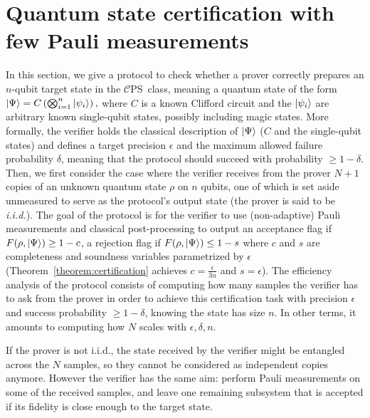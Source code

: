 \documentclass[a4paper,twocolumn,11pt,unpublished]{quantumarticle}
\newcommand{\CEPS}{$\mathcal C$PS}
\begin{document}
\section{Quantum state certification with few Pauli measurements}
\label{section:certification}
In this section, we give a protocol to check whether a prover correctly prepares an $n$-qubit target state in the \CEPS\ class, meaning a quantum state of the form
        \(
        \ket{\Psi} = C\left(\bigotimes_{i=1}^n \ket{\psi_i}\right),
        \)
        where $C$ is a known Clifford circuit and the $\ket{\psi_i}$ are arbitrary known single-qubit states, possibly including magic states.
        More formally, 
the verifier holds the classical description of $\ket\Psi$ ($C$ and the single-qubit states) and defines a target precision $\epsilon$ and the maximum allowed failure probability $\delta$, meaning that the protocol should succeed with probability $\geq 1-\delta$. Then, we first consider the case where the verifier receives from the prover $N+1$ copies of an unknown quantum state $\rho$ on $n$ qubits, one of which is set aside unmeasured to serve as the protocol's output state (the prover is said to be \textit{i.i.d.}).
The goal of the protocol is for the verifier to use (non-adaptive) Pauli measurements and classical post-processing to output an acceptance flag if $F(\rho, \ket\Psi) \geq 1-c$, a rejection flag if $F(\rho, \ket\Psi)\leq 1-s$ where $c$ and $s$ are completeness and soundness variables parametrized by $\epsilon$ (Theorem~\ref{theorem:certification} achieves $c=\frac{\epsilon}{3n}$ and $s=\epsilon$).
The efficiency analysis of the protocol consists of computing how many samples the verifier has to ask from the prover in order to achieve this certification task with precision $\epsilon$ and success probability $\geq1-\delta$, knowing the state has size $n$. In other terms, it amounts to computing how $N$ scales with $\epsilon, \delta, n$.

If the prover is not i.i.d., the state received by the verifier might be entangled across the $N$ samples, so they cannot be considered as independent copies anymore. However the verifier has the same aim: perform Pauli measurements on some of the received samples, and leave one remaining subsystem that is accepted if its fidelity is close enough to the target state.
\end{document}
